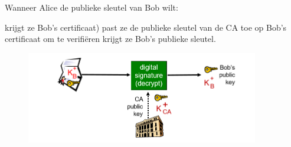 \noindent Wanneer Alice de publieke sleutel van Bob wilt:

\bi
\itf krijgt ze Bob’s certificaat)
\itf past ze de publieke sleutel van de CA toe op Bob’s certificaat om te verifiëren
\itf krijgt ze Bob’s publieke sleutel. 
\ei

\begin{figure}[h]
    \centering
\includegraphics[width=4in]{./img/imghfdst8/hfdst8puntje12.png}
\caption{ }      
    \label{fig: }
\end{figure}

